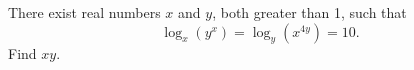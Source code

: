 There exist real numbers $x$ and $y$, both greater than 1, such that $$\log_x(y^x) = \log_y(x^{4y}) = 10.$$ Find $xy$.
